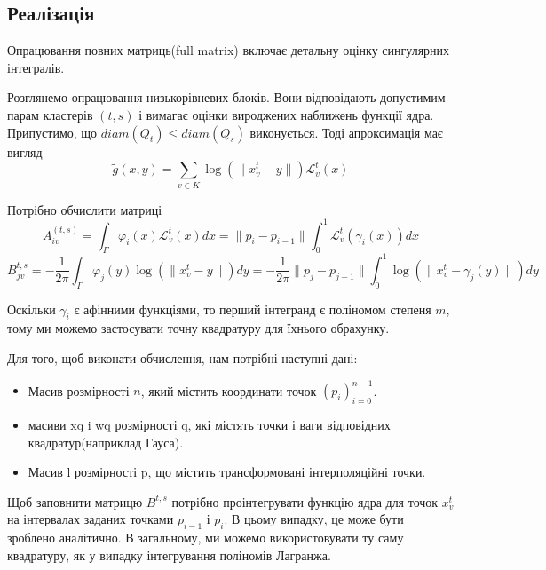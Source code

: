 \documentclass[12pt]{report}
\begin{document}
	\subsection{Реалізація}
	\hspace{0.8cm} Опрацювання повних матриць(full matrix) включає детальну оцінку сингулярних інтегралів.
	\par Розглянемо опрацювання низькорівневих блоків. Вони відповідають допустимим парам кластерів $(t,s)$ і вимагає оцінки вироджених наближень функції ядра. Припустимо, що $diam(Q_t)\le diam(Q_s)$ виконується. Тоді апроксимація має вигляд
	$$\tilde{g}(x,y)=\sum_{v\in K}\log(\|x_v^t-y\|)\mathcal{L}_v^t(x)$$
	\par Потрібно обчислити матриці
	$$A_{iv}^{(t,s)}=\int_{\Gamma}\varphi_i(x)\mathcal{L}_v^t(x)dx=\|p_i-p_{i-1}\|\int_{0}^{1}\mathcal{L}_v^t(\gamma_i(x))dx$$
	$$B_{jv}^{t,s}=-\frac{1}{2\pi}\int_{\Gamma}\varphi_j(y)\log(\|x_v^t-y\|)dy=-\frac{1}{2\pi}\|p_j-p_{j-1}\|\int_{0}^{1}\log(\|x_v^t-\gamma_j(y)\|)dy$$ 
	\par Оскільки $\gamma_i$ є афінними функціями, то перший інтегранд є поліномом степеня $m$, тому ми можемо застосувати точну квадратуру для їхнього обрахунку.
	\par Для того, щоб виконати обчислення, нам потрібні наступні дані:
	\begin{itemize}
		\item Масив розмірності $n$, який містить координати точок $(p_i)_{i=0}^{n-1}$.
		\item масиви xq i wq розмірності q, які містять точки і ваги відповідних квадратур(наприклад Гауса).
		\item Масив l розмірності p, що містить трансформовані інтерполяційні точки. 
	\end{itemize} 
	\par Щоб заповнити матрицю $B^{t,s}$ потрібно проінтегрувати функцію ядра для точок $x_v^t$ на інтервалах заданих точками $p_{i-1}$ і $p_i$. В цьому випадку, це може бути зроблено аналітично. В загальному, ми можемо використовувати ту саму квадратуру, як у випадку інтегрування поліномів Лагранжа.
\end{document}
